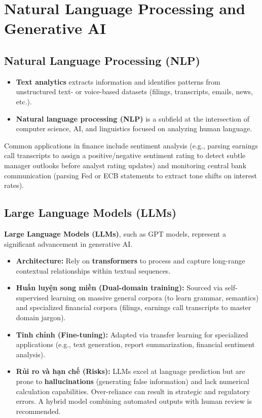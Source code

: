 \section{Natural Language Processing and Generative AI}
\label{sec:NLP and Generative AI}

\subsection{Natural Language Processing (NLP)}
\begin{itemize}[noitemsep, topsep=2pt, parsep=0pt]
	\item \textbf{Text analytics} extracts information and identifies patterns from unstructured text- or voice-based datasets (filings, transcripts, emails, news, etc.).
	\item \textbf{Natural language processing (NLP)} is a subfield at the intersection of computer science, AI, and linguistics focused on analyzing human language.
\end{itemize}
Common applications in finance include sentiment analysis (e.g., parsing earnings call transcripts to assign a positive/negative sentiment rating to detect subtle manager outlooks before analyst rating updates) and monitoring central bank communication (parsing Fed or ECB statements to extract tone shifts on interest rates).

\subsection{Large Language Models (LLMs)}
\textbf{Large Language Models (LLMs)}, such as GPT models, represent a significant advancement in generative AI.
\begin{itemize}[noitemsep, topsep=2pt, parsep=0pt]
	\item \textbf{Architecture:} Rely on \textbf{transformers} to process and capture long-range contextual relationships within textual sequences.
	\item \textbf{Huấn luyện song miền (Dual-domain training):} Sourced via self-supervised learning on massive general corpora (to learn grammar, semantics) and specialized financial corpora (filings, earnings call transcripts to master domain jargon).
	\item \textbf{Tinh chỉnh (Fine-tuning):} Adapted via transfer learning for specialized applications (e.g., text generation, report summarization, financial sentiment analysis).
	\item \textbf{Rủi ro và hạn chế (Risks):} LLMs excel at language prediction but are prone to \textbf{hallucinations} (generating false information) and lack numerical calculation capabilities. Over-reliance can result in strategic and regulatory errors. A hybrid model combining automated outputs with human review is recommended.
\end{itemize}

